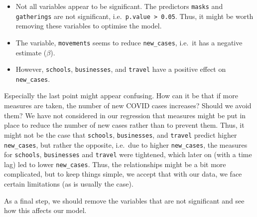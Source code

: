 \documentclass[
]{book}
\begin{document}
\begin{itemize}
\item
  Not all variables appear to be significant. The predictors \texttt{masks} and \texttt{gatherings} are not significant, i.e.~\texttt{p.value\ \textgreater{}\ 0.05}. Thus, it might be worth removing these variables to optimise the model.
\item
  The variable, \texttt{movements} seems to reduce \texttt{new\_cases}, i.e.~it has a negative estimate (\(\beta\)).
\item
  However, \texttt{schools}, \texttt{businesses}, and \texttt{travel} have a positive effect on \texttt{new\_cases}.
\end{itemize}

Especially the last point might appear confusing. How can it be that if more measures are taken, the number of new COVID cases increases? Should we avoid them? We have not considered in our regression that measures might be put in place to reduce the number of new cases rather than to prevent them. Thus, it might not be the case that \texttt{schools}, \texttt{businesses}, and \texttt{travel} predict higher \texttt{new\_cases}, but rather the opposite, i.e.~due to higher \texttt{new\_cases}, the measures for \texttt{schools}, \texttt{businesses} and \texttt{travel} were tightened, which later on (with a time lag) led to lower \texttt{new\_cases}. Thus, the relationships might be a bit more complicated, but to keep things simple, we accept that with our data, we face certain limitations (as is usually the case).

As a final step, we should remove the variables that are not significant and see how this affects our model.
\end{document}
